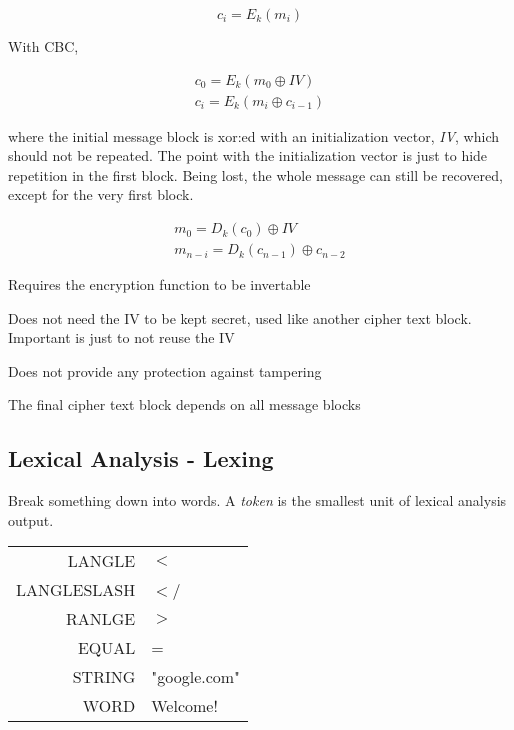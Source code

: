 \documentclass[12pt]{article}
\begin{document}
\begin{equation}
c_i = E_k(m_i)
\end{equation}

With CBC, 

\begin{equation}
\begin{split}
c_0 = E_k(m_0 \oplus IV) \\
c_i = E_k(m_i \oplus c_{i-1})
\end{split}
\end{equation}

where the initial message block is xor:ed with an initialization vector, \emph{IV}, which should not be repeated. The point with the initialization vector is just to hide repetition in the first block. Being lost, the whole message can still be recovered, except for the very first block.

\begin{equation}
\begin{split}
m_0 = D_k(c_0) \oplus IV \\
m_{n-i} = D_k(c_{n-1}) \oplus c_{n-2}
\end{split}
\end{equation}

\begin{list}{*}{
\setlength{\itemsep}{0pt}
\setlength{\parsep}{0pt}
\setlength{\topsep}{0pt}
\setlength{\partopsep}{0pt}
\setlength{\leftmargin}{2em}
\setlength{\labelwidth}{1.5em}
\setlength{\labelsep}{0.5em}
}
\item Requires the encryption function to be invertable
\item Does not need the IV to be kept secret, used like another cipher text block. Important is just to not reuse the IV
\item Does not provide any protection against tampering
\item The final cipher text block depends on all message blocks
\end{list}

\subsection{Lexical Analysis - Lexing}

Break something down into words. A \emph{token} is the smallest unit of lexical analysis output.

\begin{tabular}{r | l}
	LANGLE & $<$ \\
	LANGLESLASH & $<$\slash \\
	RANLGE & $>$ \\
	EQUAL & = \\
	STRING & "google.com" \\
	WORD & Welcome!
\end{tabular}
\end{document}
